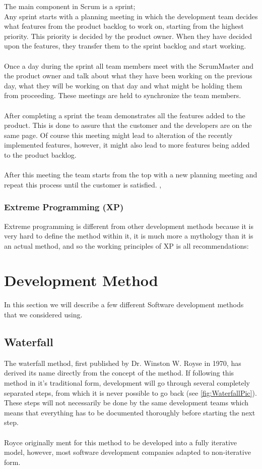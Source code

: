 The main component in Scrum is a sprint; \\
Any sprint starts with a planning meeting in which the development team decides what features from the product backlog to work on, starting from the highest priority. This priority is decided by the product owner. When they have decided upon the features, they transfer them to the sprint backlog and start working. \\
\\
Once a day during the sprint all team members meet with the ScrumMaster and the product owner and talk about what they have been working on the previous day, what they will be working on that day and what might be holding them from proceeding. These meetings are held to synchronize the team members.\\
\\
After completing a sprint the team demonstrates all the features added to the product. This is done to assure that the customer and the developers are on the same page. Of course this meeting might lead to alteration of the recently implemented features, however, it might also lead to more features being added to the product backlog.\\
\\
After this meeting the team starts from the top with a new planning meeting and repeat this process until the customer is satisfied.
\cite{goat}, \cite{scrum}
\subsubsection{Extreme Programming (XP)}
Extreme programming is different from other development methods because it is very hard to define the method within it, it is much more a mythology than it is an actual method, and so the working principles of XP is all recommendations:
\section{Development Method}
\label{sec:DevelopmentMethods}
In this section we will describe a few different Software development methods that we considered using.

\subsection{Waterfall}
The waterfall method, first published by Dr. Winston W. Royse in 1970, has derived its name directly from the concept of the method. If following this method in it's traditional form, development will go through several completely separated steps, from which it is never possible to go back (see \ref{fig:WaterfallPic}). These steps will not necessarily be done by the same development teams which means that everything has to be documented thoroughly before starting the next step.\\
 \\
Royce originally ment for this method to be developed into a fully iterative model, however, most software development companies adapted to non-iterative form.
\cite{waterfallroyce}

